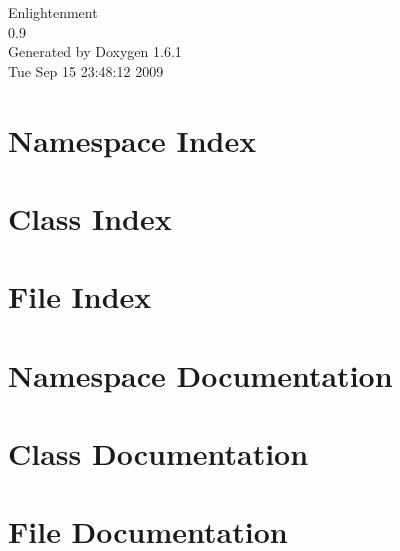 \documentclass[a4paper]{book}
\begin{document}
\begin{titlepage}
\vspace*{7cm}
\begin{center}
{\Large Enlightenment \\[1ex]\large 0.9 }\\
\vspace*{1cm}
{\large Generated by Doxygen 1.6.1}\\
\vspace*{0.5cm}
{\small Tue Sep 15 23:48:12 2009}\\
\end{center}
\end{titlepage}
\clearemptydoublepage
{}
\tableofcontents
\clearemptydoublepage
{}
\chapter{Namespace Index}

\chapter{Class Index}

\chapter{File Index}

\chapter{Namespace Documentation}

\chapter{Class Documentation}











\chapter{File Documentation}








\printindex
\end{document}
